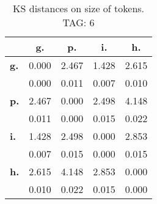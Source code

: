 \begin{table}[h!]
\begin{center}
\begin{tabular}{| l || c | c | c | c |}\hline
 & {\bf g.} & {\bf p.} & {\bf i.} & {\bf h.} \\\hline\hline
{\bf g.} & 0.000 & 2.467 & 1.428 & 2.615 \\
{\bf } & 0.000 & 0.011 & 0.007 & 0.010 \\\hline
{\bf p.} & 2.467 & 0.000 & 2.498 & 4.148 \\
{\bf } & 0.011 & 0.000 & 0.015 & 0.022 \\\hline
{\bf i.} & 1.428 & 2.498 & 0.000 & 2.853 \\
{\bf } & 0.007 & 0.015 & 0.000 & 0.015 \\\hline
{\bf h.} & 2.615 & 4.148 & 2.853 & 0.000 \\
{\bf } & 0.010 & 0.022 & 0.015 & 0.000 \\\hline
\end{tabular}
\caption{KS distances on size of tokens. TAG: 6}
\end{center}
\end{table}